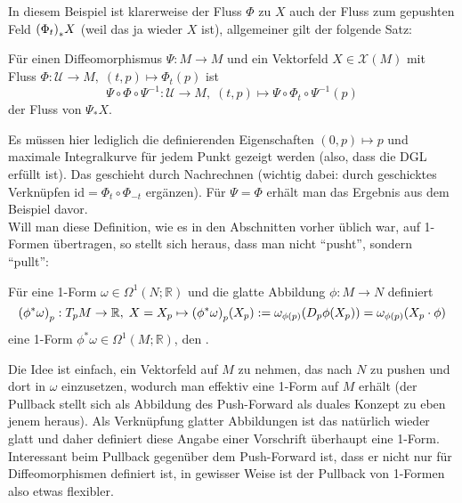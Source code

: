 \documentclass[../H_Analysis_main.tex]{subfiles}
\begin{document}
In diesem Beispiel ist klarerweise der Fluss $\Phi$ zu $X$ auch der Fluss zum gepushten Feld $\qty(\Phi_t)_* X$ (weil das ja wieder $X$ ist), allgemeiner gilt der folgende Satz:
\begin{satz}
Für einen Diffeomorphismus $\Psi: M \rightarrow M$ und ein Vektorfeld $X \in \mathcal{X}(M)$ mit Fluss $\Phi: \mathcal{U} \rightarrow M, \; (t, p) \mapsto \Phi_t(p)$ ist
\begin{equation}
\Psi \circ \Phi \circ \Psi^{-1}: \mathcal{U} \rightarrow M, \; (t, p) \mapsto \Psi \circ \Phi_t \circ \Psi^{-1}(p)
\end{equation}
der Fluss von $\Psi_* X$.
\end{satz}
Es müssen hier lediglich die definierenden Eigenschaften $(0, p) \mapsto p$ und maximale Integralkurve für jedem Punkt gezeigt werden (also, dass die DGL erfüllt ist). Das geschieht durch Nachrechnen (wichtig dabei: durch geschicktes Verknüpfen $\text{id} = \Phi_t \circ \Phi_{-t}$ ergänzen). Für $\Psi = \Phi$ erhält man das Ergebnis aus dem Beispiel davor.\\


Will man diese Definition, wie es in den Abschnitten vorher üblich war, auf 1-Formen übertragen, so stellt sich heraus, dass man nicht \enquote{pusht}, sondern \enquote{pullt}:
\begin{defi}[Pullback]
Für eine 1-Form $\omega \in \Omega^1(N; \mathbb{R})$ und die glatte Abbildung $\phi: M \rightarrow N$ definiert
\begin{equation}
\qty(\phi^*\omega)_p: T_p M \rightarrow \mathbb{R}, \; X = X_p \mapsto \qty(\phi^*\omega)_p(X_p) := \omega_{\phi(p)}\qty(D_p \phi(X_p)) = \omega_{\phi(p)}\qty(X_p \cdot \phi)
\end{equation}
eine 1-Form $\phi^*\omega \in \Omega^1(M; \mathbb{R})$, den .
\end{defi}
Die Idee ist einfach, ein Vektorfeld auf $M$ zu nehmen, das nach $N$ zu pushen und dort in $\omega$ einzusetzen, wodurch man effektiv eine 1-Form auf $M$ erhält (der Pullback stellt sich als Abbildung des Push-Forward als duales Konzept zu eben jenem heraus). Als Verknüpfung glatter Abbildungen ist das natürlich wieder glatt und daher definiert diese Angabe einer Vorschrift überhaupt eine 1-Form. Interessant beim Pullback gegenüber dem Push-Forward ist, dass er nicht nur für Diffeomorphismen definiert ist, in gewisser Weise ist der Pullback von 1-Formen also etwas flexibler.
\end{document}
